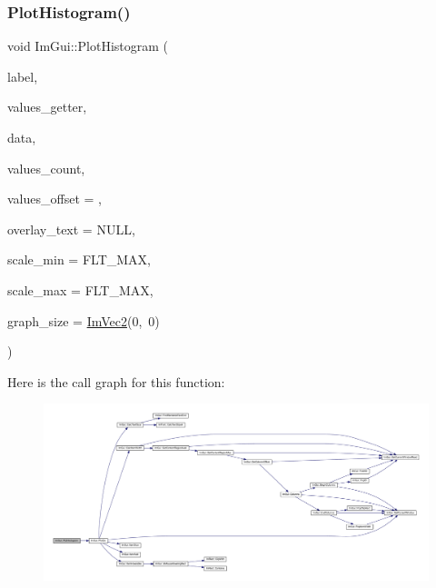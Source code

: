 \subsubsection{\texorpdfstring{Plot\+Histogram()}{PlotHistogram()}\hspace{0.1cm}{\footnotesize\ttfamily [2/2]}}
{\footnotesize\ttfamily void Im\+Gui\+::\+Plot\+Histogram (\begin{DoxyParamCaption}\item[{const char $\ast$}]{label,  }\item[{float($\ast$)(void $\ast$data, int idx)}]{values\+\_\+getter,  }\item[{void $\ast$}]{data,  }\item[{int}]{values\+\_\+count,  }\item[{int}]{values\+\_\+offset = {},  }\item[{const char $\ast$}]{overlay\+\_\+text = {\ttfamily NULL},  }\item[{float}]{scale\+\_\+min = {\ttfamily FLT\+\_\+MAX},  }\item[{float}]{scale\+\_\+max = {\ttfamily FLT\+\_\+MAX},  }\item[{\mbox{\hyperlink{struct_im_vec2}{Im\+Vec2}}}]{graph\+\_\+size = {\ttfamily \mbox{\hyperlink{struct_im_vec2}{Im\+Vec2}}(0,~0)} }\end{DoxyParamCaption})}

Here is the call graph for this function\+:
\nopagebreak
\begin{figure}[H]
\begin{center}
\leavevmode
\includegraphics[width=350pt]{namespace_im_gui_af8089203baf8cf723a158c9e34bda2a4_cgraph}
\end{center}
\end{figure}
\mbox{\label{namespace_im_gui_a2bc21c56e4796855313804086cca114f}} 
